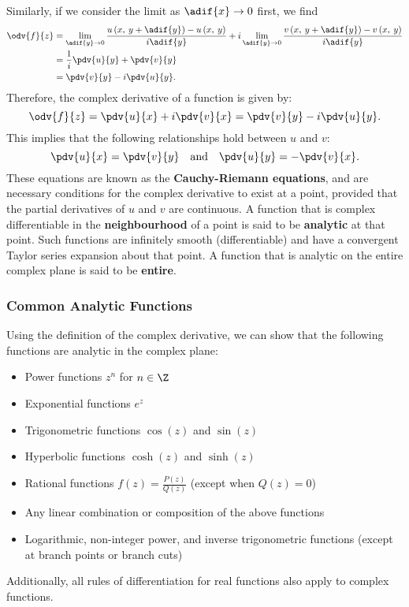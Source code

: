 \documentclass{article}
\begin{document}
Similarly, if we consider the limit as \(\adif{x} \to 0\) first, we find
\begin{align*}
    \odv{f}{z} & = \lim_{\adif{y} \to 0} \frac{u\left( x,\: y + \adif{y} \right) - u\left( x,\: y \right)}{i \adif{y}} + i \lim_{\adif{y} \to 0} \frac{v\left( x,\: y + \adif{y} \right) - v\left( x,\: y \right)}{i \adif{y}} \\
               & = \frac{1}{i} \pdv{u}{y} + \pdv{v}{y}                                                                                                                                                                         \\
               & = \pdv{v}{y} - i \pdv{u}{y}.
\end{align*}
Therefore, the complex derivative of a function is given by:
\begin{equation*}
    \odv{f}{z} = \pdv{u}{x} + i \pdv{v}{x} = \pdv{v}{y} - i \pdv{u}{y}.
\end{equation*}
This implies that the following relationships hold between \(u\) and
\(v\):
\begin{equation*}
    \pdv{u}{x} = \pdv{v}{y} \quad \text{and} \quad \pdv{u}{y} = -\pdv{v}{x}.
\end{equation*}
These equations are known as the \textbf{Cauchy-Riemann equations}, and
are necessary conditions for the complex derivative to exist at a point,
provided that the partial derivatives of \(u\) and \(v\) are continuous.
A function that is complex differentiable in the \textbf{neighbourhood}
of a point is said to be \textbf{analytic} at that point. Such functions are
infinitely smooth (differentiable) and have a convergent Taylor series
expansion about that point. A function that is analytic on the entire
complex plane is said to be \textbf{entire}.
\subsubsection{Common Analytic Functions}
Using the definition of the complex derivative, we can show that the
following functions are analytic in the complex plane:
\begin{itemize}
    \item Power functions \(z^n\) for \(n \in \Z\)
    \item Exponential functions \(e^z\)
    \item Trigonometric functions \(\cos{\left( z \right)}\) and
          \(\sin{\left( z \right)}\)
    \item Hyperbolic functions \(\cosh{\left( z \right)}\) and
          \(\sinh{\left( z \right)}\)
    \item Rational functions \(f\left( z \right) = \frac{P\left( z
          \right)}{Q\left( z \right)}\) (except when \(Q\left( z
          \right) = 0\))
    \item Any linear combination or composition of the above functions
    \item Logarithmic, non-integer power, and inverse trigonometric
          functions (except at branch points or branch cuts)
\end{itemize}
Additionally, all rules of differentiation for real functions also apply
to complex functions.
\end{document}
